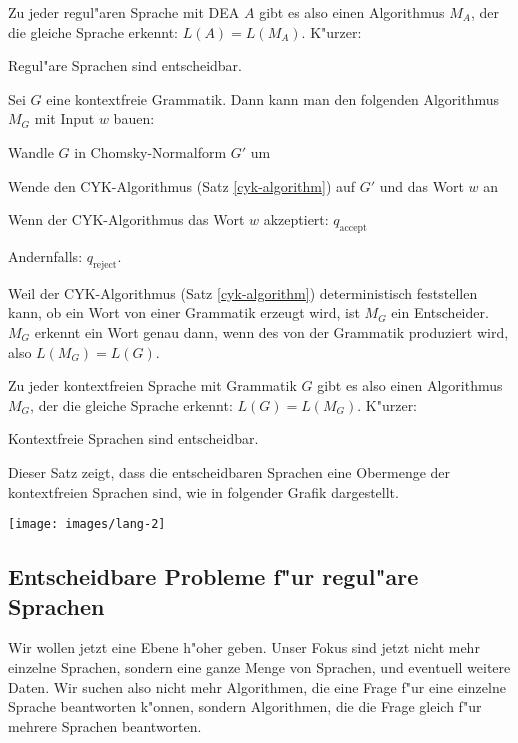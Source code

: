 Zu jeder regul"aren Sprache mit DEA $A$ gibt es also einen
Algorithmus $M_A$, der die gleiche Sprache erkennt: $L(A)=L(M_A)$.
K"urzer:

\begin{satz}
\label{regulaer-entscheidbar}
Regul"are Sprachen sind entscheidbar.
\end{satz}

\begin{beispiel}
Sei $G$ eine kontextfreie Grammatik.
Dann kann man den folgenden Algorithmus $M_G$ mit Input $w$ bauen:
\begin{compactenum}
\item Wandle $G$ in Chomsky-Normalform $G'$ um
\item Wende den CYK-Algorithmus (Satz \ref{cyk-algorithm}) auf $G'$ und das
Wort $w$ an
\item Wenn der CYK-Algorithmus das Wort $w$ akzeptiert: $q_{\text{accept}}$
\item Andernfalls: $q_{\text{reject}}$.
\end{compactenum}
Weil der CYK-Algorithmus (Satz \ref{cyk-algorithm}) deterministisch 
feststellen kann, ob ein Wort von einer Grammatik erzeugt wird, ist
$M_G$ ein Entscheider.
$M_G$ erkennt ein Wort genau dann, wenn des von
der Grammatik produziert wird, also $L(M_G)=L(G)$.
\end{beispiel}

Zu jeder kontextfreien Sprache mit Grammatik $G$ gibt es also einen 
Algorithmus $M_G$, der die gleiche Sprache erkennt: $L(G)=L(M_G)$.
K"urzer:

\begin{satz}
Kontextfreie Sprachen sind entscheidbar.
\end{satz}
Dieser Satz zeigt, dass die entscheidbaren Sprachen eine 
Obermenge der kontextfreien Sprachen sind, wie in folgender
Grafik dargestellt.
\begin{center}
\texttt{[image: images/lang-2]}
\end{center}

\subsection{Entscheidbare Probleme f"ur regul"are Sprachen}
Wir wollen jetzt eine Ebene h"oher geben.
Unser Fokus sind jetzt nicht
mehr einzelne Sprachen, sondern eine ganze Menge von Sprachen, und eventuell
weitere Daten.
Wir suchen also nicht mehr Algorithmen, die eine Frage
f"ur eine einzelne Sprache beantworten k"onnen, sondern Algorithmen, die
die Frage gleich f"ur mehrere Sprachen beantworten.

